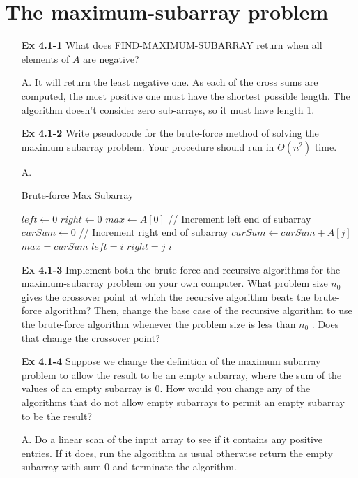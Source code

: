 \documentclass[fontsize=12pt,paper=a4]{book}
\newcommand{\To}{\ \textbf{to}\ }
\renewcommand{\Comment}[1]{// #1}
\begin{document}
\section{The maximum-subarray problem}
\begin{enumerate}
	\item[\textbf{Ex 4.1-1}]
		What does FIND-MAXIMUM-SUBARRAY return when all elements of $A$ are negative?
	\item[A.]
	It will return the least negative one. As each of the cross sums are computed, the most positive one must have the shortest possible length. The algorithm doesn’t consider zero sub-arrays, so it must have length 1.
	
	\item[\textbf{Ex 4.1-2}]
		Write pseudocode for the brute-force method of solving the maximum subarray problem. Your procedure should run in $\Theta(n^2)$ time.
	\item[A.]	
		\begin{algorithm}
			\caption{Brute-force Max Subarray}
			\begin{algorithmic}
					\State $left \gets 0$
					\State $right \gets 0$
					\State $max \gets A[0]$
					\Comment{Increment left end of subarray}
					\For{$i \gets 0 \To n-1$}
						\State $curSum \gets 0$
						\Comment{Increment right end of subarray}
						\For{$j \gets i \To n-1$}
							\State $curSum \gets curSum + A[j]$
								\State $max = curSum$
								\State $left = i$
								\State $right = j$
							\EndIf
						\EndFor
					\EndFor
					\State \Return $i$
				\EndProcedure
			\end{algorithmic}
		\end{algorithm}
		
	\item[\textbf{Ex 4.1-3}]
		Implement both the brute-force and recursive algorithms for the maximum-subarray problem on your own computer. What problem size $n_0$ gives the crossover point at which the recursive algorithm beats the brute-force algorithm? Then, change the base case of the recursive algorithm to use the brute-force algorithm whenever the problem size is less than $n_0$ . Does that change the crossover point?
		
	\item[\textbf{Ex 4.1-4}]
		Suppose we change the definition of the maximum subarray problem to allow the result to be an empty subarray, where the sum of the values of an empty subarray is 0. How would you change any of the algorithms that do not allow empty subarrays to permit an empty subarray to be the result?
	\item[A.]
		Do a linear scan of the input array to see if it contains any positive entries. If it does, run the algorithm as usual otherwise return the empty subarray with sum 0 and terminate the algorithm.
		

\end{enumerate}
\end{document}
